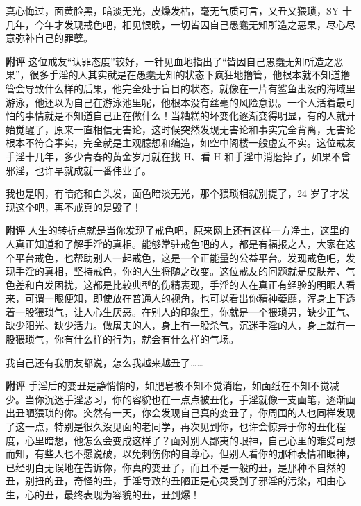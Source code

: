 \begin{case}[变丑]
    真心悔过，面黄脸黑，暗淡无光，皮燥发枯，毫无气质可言，又丑又猥琐，SY 十几年，今年才发现戒色吧，相见恨晚，一切皆因自己愚蠢无知所造之恶果，尽心尽意弥补自己的罪孽。

    \textbf{附评} 这位戒友“认罪态度”较好，一针见血地指出了“皆因自己愚蠢无知所造之恶果”，很多手淫的人其实就是在愚蠢无知的状态下疯狂地撸管，他根本就不知道撸管会导致什么样的后果，他完全处于盲目的状态，就像在一片有鲨鱼出没的海域里游泳，他还以为自己在游泳池里呢，他根本没有丝毫的风险意识。一个人活着最可怕的事情就是不知道自己正在做什么！当糟糕的坏变化逐渐变得明显，有的人就开始觉醒了，原来一直相信无害论，这时候突然发现无害论和事实完全背离，无害论根本不符合事实，完全就是主观臆想和编造，如空中阁楼一般虚妄不实。这位戒友手淫十几年，多少青春的黄金岁月就在找 H、看 H 和手淫中消磨掉了，如果不曾邪淫，也许早就成就一番伟业了。
\end{case}

\begin{case}[变丑]
    我也是啊，有暗疮和白头发，面色暗淡无光，那个猥琐相就别提了，24 岁了才发现这个吧，再不戒真的是毁了！

    \textbf{附评} 人生的转折点就是当你发现了戒色吧，原来网上还有这样一方净土，这里的人真正知道和了解手淫的真相。能够常驻戒色吧的人，都是有福报之人，大家在这个平台戒色，也帮助别人一起戒色，这是一个正能量的公益平台。发现戒色吧，发现手淫的真相，坚持戒色，你的人生将随之改变。这位戒友的问题就是皮肤差、气色差和白发困扰，这都是比较典型的伤精表现，手淫的人在真正有经验的明眼人看来，可谓一眼便知，即使放在普通人的视角，也可以看出你精神萎靡，浑身上下透着一股猥琐气，让人心生厌恶。在别人的印象里，你就是一个猥琐男，缺少正气、缺少阳光、缺少活力。做屠夫的人，身上有一股杀气，沉迷手淫的人，身上就有一股猥琐气，你有什么样的行为，就会有什么样的气场。
\end{case}

\begin{case}[变丑]
    我自己还有我朋友都说，怎么我越来越丑了……

    \textbf{附评} 手淫后的变丑是静悄悄的，如肥皂被不知不觉消磨，如面纸在不知不觉减少。当你沉迷手淫恶习，你的容貌也在一点点被丑化，手淫就像一支画笔，逐渐画出丑陋猥琐的你。突然有一天，你会发现自己真的变丑了，你周围的人也同样发现了这一点，特别是很久没见面的老同学，再次见到你，也许会惊异于你的丑化程度，心里暗想，他怎么会变成这样了？面对别人鄙夷的眼神，自己心里的难受可想而知，有些人也不愿说破，以免刺伤你的自尊心，但别人看你的那种表情和眼神，已经明白无误地在告诉你，你真的变丑了，而且不是一般的丑，是那种不自然的丑，别扭的丑，奇怪的丑，手淫导致的丑陋正是心灵受到了邪淫的污染，相由心生，心的丑，最终表现为容貌的丑，丑到爆！
\end{case}

